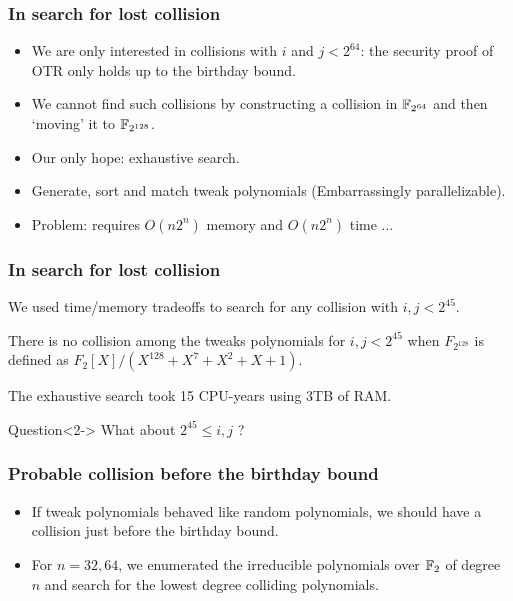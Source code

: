 \documentclass{beamer}
\begin{document}
	\begin{frame}
		\frametitle{In search for lost collision}

		\begin{itemize}
			\item We are only interested in collisions with $i$ and $j < 2^{64}$: the security proof of OTR only holds up to the birthday bound.
			
			\item<2-> We cannot find such collisions by constructing a collision in $\mathbb{F}_{2^{64}}$ and then `moving' it to $\mathbb{F}_{2^{128}}$.
			
			\item<3-> Our only hope: exhaustive search. 
			
			\item<4-> Generate, sort and match tweak polynomials (Embarrassingly parallelizable).
			
			\item<5-> Problem: requires $O(n 2^n)$ memory and $O(n 2^n)$ time ...
		\end{itemize}
	\end{frame}

	\begin{frame}
		\frametitle{In search for lost collision}



We used time/memory tradeoffs to search for any collision with $i, j < 2^{45}$.

		\begin{theorem}
			There is no collision among the tweaks polynomials for $i, j < 2^{45}$ when $F_{2^{128}}$ is defined as $F_2[X]/(X^{128}+X^{7}+X^{2}+X+1)$.
		\end{theorem}
		
		The exhaustive search took 15 CPU-years using 3TB of RAM.


		\begin{exampleblock}{Question}<2->
			What about $2^{45} \leq i, j$ ?
		\end{exampleblock}
	\end{frame}

	\begin{frame}
		\frametitle{Probable collision before the birthday bound}

		\begin{itemize}
			\item If tweak polynomials behaved like random polynomials, we should have a collision just before the birthday bound.
			
			\item For $n = 32, 64$, we enumerated the irreducible polynomials over $\mathbb{F}_2$ of degree $n$ and search for the lowest degree colliding polynomials.
		\end{itemize}
		
	\end{frame}
\end{document}
